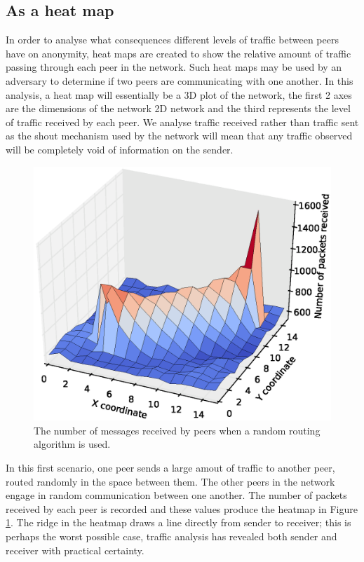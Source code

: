 \documentclass[ %
                    author={Luke Murray},
                supervisor={Dr. Simon Hollis},
                     title={Shadow Peer-to-Peer Networks},
                  subtitle={},
                    degree={MEng},
                      year={2013} ]{thesis}
\begin{document}
\subsection{As a heat map}

In order to analyse what consequences different levels of traffic between peers have on anonymity, heat maps are created to show the relative amount of traffic passing through each peer in the network. Such heat maps may be used by an adversary to determine if two peers are communicating with one another. In this analysis, a heat map will essentially be a 3D plot of the network, the first 2 axes are the dimensions of the network 2D network and the third represents the level of traffic received by each peer. We analyse traffic received rather than traffic sent as the shout mechanism used by the network will mean that any traffic observed will be completely void of information on the sender. 

\begin{figure}[h]
    \centering
    \begin{minipage}[b]{0.8\linewidth}
        \centering
        \includegraphics{diagrams/heat_map_random.eps}
    \caption{The number of messages received by peers when a random routing algorithm is used.}
    \end{minipage}
    \label{heatmap_random}
\end{figure}

In this first scenario, one peer sends a large amout of traffic to another peer, routed randomly in the space between them. The other peers in the network engage in random communication between one another. The number of packets received by each peer is recorded and these values produce the heatmap in Figure \ref{heatmap_random}. The ridge in the heatmap draws a line directly from sender to receiver; this is perhaps the worst possible case, traffic analysis has revealed both sender and receiver with practical certainty.
\end{document}
